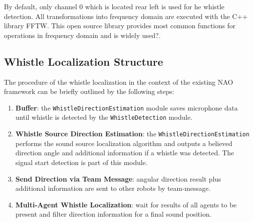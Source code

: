 
By default, only channel $0$ which is located rear left is used for he whistle detection.
All transformations into frequency domain are executed with the C++ library
\ac{FFTW}.
This open source library provides most common functions for operations
in frequency domain and is widely used?.

\subsection{Whistle Localization Structure}
\label{subsec:03_whistleLocalizationStructure}

The procedure of the whistle localization in the context of the existing
NAO framework can be briefly outlined by the following steps:
\begin{enumerate}
      \item \textbf{Buffer}: the \lstinline!WhistleDirectionEstimation! module saves microphone
            data until whistle is detected by the \lstinline!WhistleDetection! module.
      \item \textbf{Whistle Source Direction Estimation}: the \lstinline!WhistleDirectionEstimation!
            performs the sound source localization algorithm and outputs a
            believed direction angle and additional information if a whistle was detected.
            The signal start detection is part of this module.
      \item \textbf{Send Direction via Team Message}: angular direction result plus additional information
            are sent to other robots by team-message.
      \item \textbf{Multi-Agent Whistle Localization}: wait for results of all agents to be present
            and filter direction information for a final sound position.
\end{enumerate}

